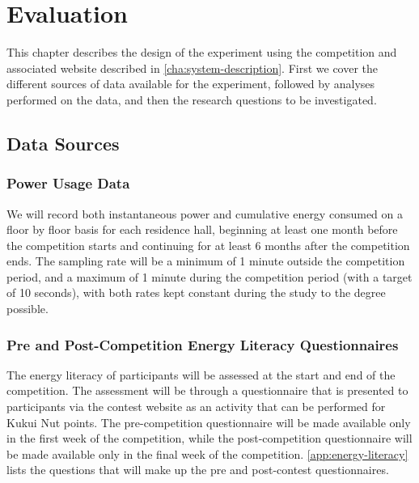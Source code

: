 \chapter{Evaluation}

This chapter describes the design of the experiment using the competition and associated website described in \autoref{cha:system-description}. First we cover the different sources of data available for the experiment, followed by analyses performed on the data, and then the research questions to be investigated. 

\section{Data Sources}

\subsection{Power Usage Data}
\label{sec:power-usage-data}

We will record both instantaneous power and cumulative energy consumed on a floor by floor basis for each residence hall, beginning at least one month before the competition starts and continuing for at least 6 months after the competition ends. The sampling rate will be a minimum of 1 minute outside the competition period, and a maximum of 1 minute during the competition period (with a target of 10 seconds), with both rates kept constant during the study to the degree possible.

\subsection{Pre and Post-Competition Energy Literacy Questionnaires}
\label{sec:exp-literacy-questionnaire}

The energy literacy of participants will be assessed at the start and end of the competition. The assessment will be through a questionnaire that is presented to participants via the contest website as an activity that can be performed for Kukui Nut points. The pre-competition questionnaire will be made available only in the first week of the competition, while the post-competition questionnaire will be made available only in the final week of the competition. \autoref{app:energy-literacy} lists the questions that will make up the pre and post-contest questionnaires.

